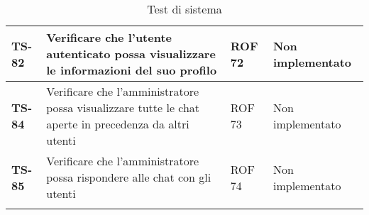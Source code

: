 \begin{longtable}{|>{\centering\arraybackslash}p{1.5cm}|p{9.8cm}|p{2cm}|p{3.5cm}|}
    \hline
    \rowcolor{gray!10}
    \textbf{TS-82} & Verificare che l'utente autenticato possa visualizzare le informazioni del suo profilo & ROF 72 & Non implementato \\ 
    \hline
    \rowcolor{gray!10}
    \textbf{TS-84} & Verificare che l'amministratore possa visualizzare tutte le chat aperte in precedenza da altri utenti& ROF 73 & Non implementato \\ 
    \hline
    \rowcolor{gray!10}
    \textbf{TS-85} & Verificare che l'amministratore possa rispondere alle chat con gli utenti & ROF 74 & Non implementato \\ 
    \hline
    \caption{Test di sistema} 
    \label{tab:test_sistema}
    \end{longtable}
    
